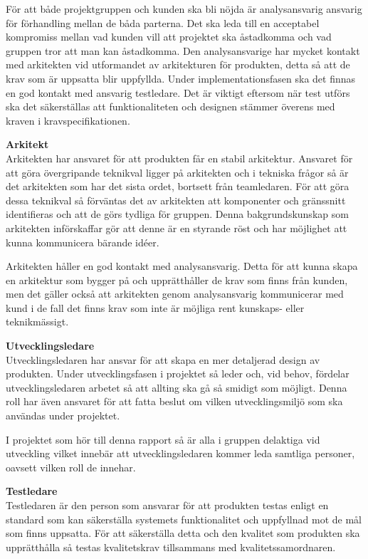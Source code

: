 För att både projektgruppen och kunden ska bli nöjda är analysansvarig ansvarig för förhandling mellan de båda parterna. Det ska leda till en acceptabel kompromiss mellan vad kunden vill att projektet ska åstadkomma och vad gruppen tror att man kan åstadkomma. Den analysansvarige har mycket kontakt med arkitekten vid utformandet av arkitekturen för produkten, detta så att de krav som är uppsatta blir uppfyllda. Under implementationsfasen ska det finnas en god kontakt med ansvarig testledare. Det är viktigt eftersom när test utförs ska det säkerställas att funktionaliteten och designen stämmer överens med kraven i kravspecifikationen.

\textbf{Arkitekt}\\
Arkitekten har ansvaret för att produkten får en stabil arkitektur. Ansvaret för att göra övergripande teknikval ligger på arkitekten och i tekniska frågor så är det arkitekten som har det sista ordet, bortsett från teamledaren. För att göra dessa teknikval så förväntas det av arkitekten att komponenter och gränssnitt identifieras och att de görs tydliga för gruppen. Denna bakgrundskunskap som arkitekten införskaffar gör att denne är en styrande röst och har möjlighet att kunna kommunicera bärande idéer.

Arkitekten håller en god kontakt med analysansvarig. Detta för att kunna skapa en arkitektur som bygger på och upprätthåller de krav som finns från kunden, men det gäller också att arkitekten genom analysansvarig kommunicerar med kund i de fall det finns krav som inte är möjliga rent kunskaps- eller teknikmässigt.

\textbf{Utvecklingsledare}\\
Utvecklingsledaren har ansvar för att skapa en mer detaljerad design av produkten. Under utvecklingsfasen i projektet så leder och, vid behov, fördelar utvecklingsledaren arbetet så att allting ska gå så smidigt som möjligt. Denna roll har även ansvaret för att fatta beslut om vilken utvecklingsmiljö som ska användas under projektet.

I projektet som hör till denna rapport så är alla i gruppen delaktiga vid utveckling vilket innebär att utvecklingsledaren kommer leda samtliga personer, oavsett vilken roll de innehar.

\textbf{Testledare}\\
Testledaren är den person som ansvarar för att produkten testas enligt en standard som kan säkerställa systemets funktionalitet och uppfyllnad mot de mål som finns uppsatta. För att säkerställa detta och den kvalitet som produkten ska upprätthålla så testas kvalitetskrav tillsammans med kvalitetssamordnaren.

